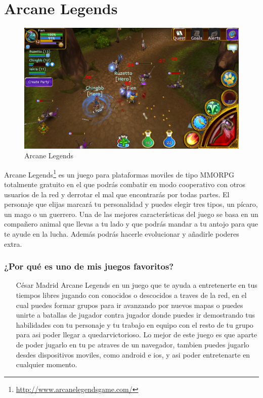 \section{Arcane Legends}

\begin{figure}[htbp]
\begin{center}
\includegraphics[width=.60\textwidth]{./imagenes/arcanelegends.png}
\caption{Arcane Legends}
\label{Arcane Legends}
\end{center}
\end{figure}
Arcane Legends\footnote{\url{http://www.arcanelegendsgame.com/}} es un juego para plataformas moviles  de tipo MMORPG totalmente gratuito en el que podrás combatir en modo cooperativo con otros usuarios de la red y derrotar el mal que encontrarás por todas partes. El personaje que elijas marcará tu personalidad y puedes elegir tres tipos, un pícaro, un mago o un guerrero. Una de las mejores características del juego se basa en un compañero animal que llevas a tu lado y que podrás mandar a tu antojo para que te ayude en la lucha. Además podrás hacerle evolucionar y añadirle poderes extra.

\subsubsection{¿Por qué es uno de mis juegos favoritos?}
\begin{itemize}
\item[César Madrid]Arcane Legends en un juego que te ayuda a entretenerte en tus tiempos libres jugando con conocidos o descocidos a traves de la red, en el cual puedes formar grupos para ir avanzando por nuevos mapas o puedes unirte a batallas de jugador contra jugador donde puedes ir demostrando tus habilidades con tu personaje y tu trabajo en equipo con el resto de tu grupo para asi poder llegar a quedarvictorioso. Lo mejor de este juego es que aparte de poder jugarlo en tu pc atraves de un navegador, tambien puedes jugarlo desdes dispositivos moviles, como android e ios, y asi poder entretenarte en cualquier momento.
\end{itemize}
